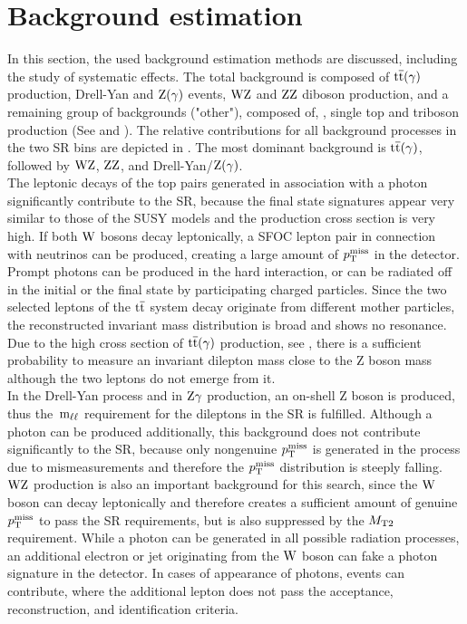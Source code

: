 \section{Background estimation}\label{sec:BKG}
In this section, the used background estimation methods are discussed, including the study of systematic effects. The total background is composed of ${\mathrm{t}\overline{\mathrm{t}}}(\gamma)$ production, Drell-Yan and $\mathrm{Z}(\gamma)$ events, $\mathrm{W}\mathrm{Z}$ and $\mathrm{Z}\mathrm{Z}$ diboson production, and a remaining group of backgrounds ("other"), composed of, \eg, single top and triboson production (See  and ). The relative contributions for all background processes in the two SR bins are depicted in . The most dominant background is ${\mathrm{t}\overline{\mathrm{t}}}(\gamma)$, followed by $\mathrm{W}\mathrm{Z}$, $\mathrm{Z}\mathrm{Z}$, and Drell-Yan/$\mathrm{Z}(\gamma)$.\\
The leptonic decays of the top pairs generated in association with a photon significantly contribute to the SR, because the final state signatures appear very similar to those of the SUSY models and the production cross section is very high. If both $\mathrm{W}$ bosons decay leptonically, a SFOC lepton pair in connection with neutrinos can be produced, creating a large amount of $p_{\mathrm{T}}^\text{miss}$ in the detector. Prompt photons can be produced in the hard interaction, or can be radiated off in the initial or the final state by participating charged particles. Since the two selected leptons of the ${\mathrm{t}\overline{\mathrm{t}}}$ system decay originate from different mother particles, the reconstructed invariant mass distribution is broad and shows no resonance. Due to the high cross section of ${\mathrm{t}\overline{\mathrm{t}}}(\gamma)$ production, see , there is a sufficient probability to measure an invariant dilepton mass close to the Z boson mass although the two leptons do not emerge from it.\\
In the Drell-Yan process and in $\mathrm{Z}\gamma$ production, an on-shell Z boson is produced, thus the $\,\text{m}_{\ell\ell}$ requirement for the dileptons in the SR is fulfilled. Although a photon can be produced additionally, this background does not contribute significantly to the SR, because only nongenuine $p_{\mathrm{T}}^\text{miss}$ is generated in the process due to mismeasurements and therefore the $p_{\mathrm{T}}^\text{miss}$ distribution is steeply falling.\\
$\mathrm{W}\mathrm{Z}$ production is also an important background for this search, since the $\mathrm{W}$ boson can decay leptonically and therefore creates a sufficient amount of genuine $p_{\mathrm{T}}^\text{miss}$ to pass the SR requirements, but is also suppressed by the $M_{\mathrm{T2}}$ requirement. While a photon can be generated in all possible radiation processes, an additional electron or jet originating from the $\mathrm{W}$ boson can fake a photon signature in the detector. In cases of appearance of photons, events can contribute, where the additional lepton does not pass the acceptance, reconstruction, and identification criteria.\\
